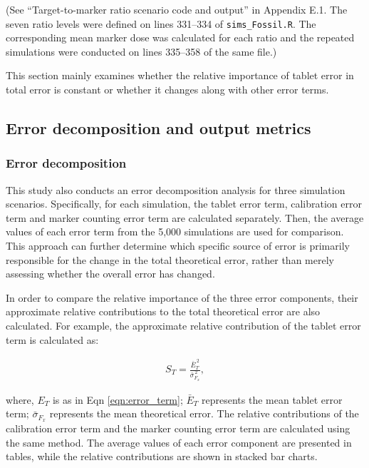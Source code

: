\documentclass[
  12pt,
]{article}
\begin{document}
(See ``Target-to-marker ratio scenario code and output'' in Appendix
E.1. The seven ratio levels were defined on lines 331--334 of
\texttt{sims\_Fossil.R}. The corresponding mean marker dose was
calculated for each ratio and the repeated simulations were conducted on
lines 335--358 of the same file.)

This section mainly examines whether the relative importance of tablet
error in total error is constant or whether it changes along with other
error terms.

\subsection{Error decomposition and output
metrics}\label{error-decomposition-and-output-metrics}

\subsubsection{Error decomposition}\label{error-decomposition}

This study also conducts an error decomposition analysis for three
simulation scenarios. Specifically, for each simulation, the tablet
error term, calibration error term and marker counting error term are
calculated separately. Then, the average values of each error term from
the 5,000 simulations are used for comparison. This approach can further
determine which specific source of error is primarily responsible for
the change in the total theoretical error, rather than merely assessing
whether the overall error has changed.

In order to compare the relative importance of the three error
components, their approximate relative contributions to the total
theoretical error are also calculated. For example, the approximate
relative contribution of the tablet error term is calculated as:

\begin{align}
\label{eqn:ST} S_T = \frac{\bar{E}_T^{\,2}}{\bar{\sigma}_{F_x}^{\,2}},
\end{align}

where, \(E_T\) is as in Eqn \eqref{eqn:error_term}; \(\bar{E}_T\)
represents the mean tablet error term; \(\bar{\sigma}_{F_x}\) represents
the mean theoretical error. The relative contributions of the
calibration error term and the marker counting error term are calculated
using the same method. The average values of each error component are
presented in tables, while the relative contributions are shown in
stacked bar charts.
\end{document}
